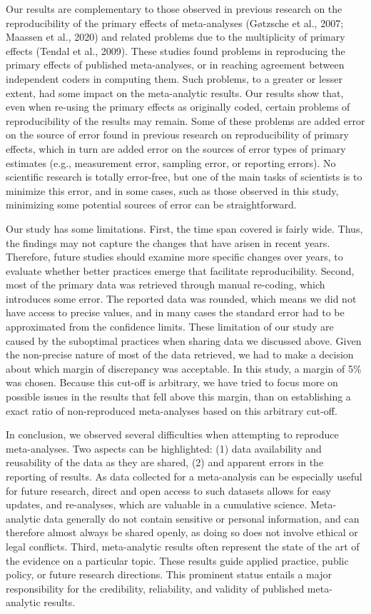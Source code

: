 \documentclass[
  ,jou, a4paper,floatsintext]{apa6}
\begin{document}
Our results are complementary to those observed in previous research on the reproducibility of the primary effects of meta-analyses (Gøtzsche et al., 2007; Maassen et al., 2020) and related problems due to the multiplicity of primary effects (Tendal et al., 2009). These studies found problems in reproducing the primary effects of published meta-analyses, or in reaching agreement between independent coders in computing them. Such problems, to a greater or lesser extent, had some impact on the meta-analytic results. Our results show that, even when re-using the primary effects as originally coded, certain problems of reproducibility of the results may remain. Some of these problems are added error on the source of error found in previous research on reproducibility of primary effects, which in turn are added error on the sources of error types of primary estimates (e.g., measurement error, sampling error, or reporting errors). No scientific research is totally error-free, but one of the main tasks of scientists is to minimize this error, and in some cases, such as those observed in this study, minimizing some potential sources of error can be straightforward.

Our study has some limitations. First, the time span covered is fairly wide. Thus, the findings may not capture the changes that have arisen in recent years. Therefore, future studies should examine more specific changes over years, to evaluate whether better practices emerge that facilitate reproducibility. Second, most of the primary data was retrieved through manual re-coding, which introduces some error. The reported data was rounded, which means we did not have access to precise values, and in many cases the standard error had to be approximated from the confidence limits. These limitation of our study are caused by the suboptimal practices when sharing data we discussed above. Given the non-precise nature of most of the data retrieved, we had to make a decision about which margin of discrepancy was acceptable. In this study, a margin of 5\% was chosen. Because this cut-off is arbitrary, we have tried to focus more on possible issues in the results that fell above this margin, than on establishing a exact ratio of non-reproduced meta-analyses based on this arbitrary cut-off.

In conclusion, we observed several difficulties when attempting to reproduce meta-analyses. Two aspects can be highlighted: (1) data availability and reusability of the data as they are shared, (2) and apparent errors in the reporting of results. As data collected for a meta-analysis can be especially useful for future research, direct and open access to such datasets allows for easy updates, and re-analyses, which are valuable in a cumulative science. Meta-analytic data generally do not contain sensitive or personal information, and can therefore almost always be shared openly, as doing so does not involve ethical or legal conflicts. Third, meta-analytic results often represent the state of the art of the evidence on a particular topic. These results guide applied practice, public policy, or future research directions. This prominent status entails a major responsibility for the credibility, reliability, and validity of published meta-analytic results.
\end{document}
